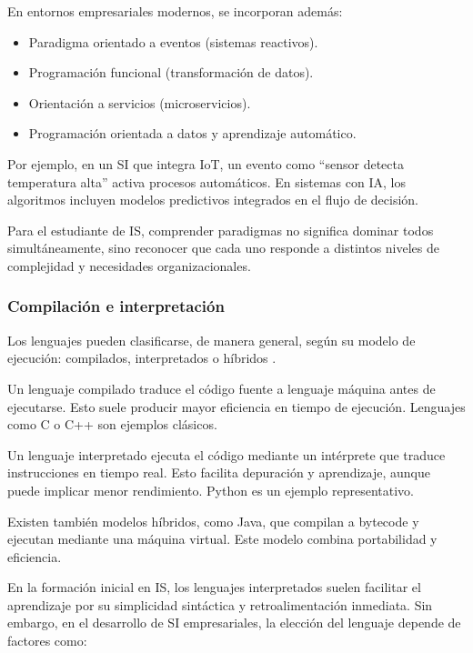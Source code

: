 \documentclass[12pt,twoside]{book}
\begin{document}
						En entornos empresariales modernos, se incorporan además:
						
						\begin{itemize}
							\item Paradigma orientado a eventos (sistemas reactivos).
							\item Programación funcional (transformación de datos).
							\item Orientación a servicios (microservicios).
							\item Programación orientada a datos y aprendizaje automático.
						\end{itemize}
						
						Por ejemplo, en un SI que integra IoT, un evento como “sensor detecta temperatura alta” activa procesos automáticos. En sistemas con IA, los algoritmos incluyen modelos predictivos integrados en el flujo de decisión.
						
						Para el estudiante de IS, comprender paradigmas no significa dominar todos simultáneamente, sino reconocer que cada uno responde a distintos niveles de complejidad y necesidades organizacionales.
					
					\subsubsection{Compilación e interpretación}
						\noindent
						Los lenguajes pueden clasificarse, de manera general, según su modelo de ejecución: compilados, interpretados o híbridos \cite{Sebesta2018Concepts,Tanenbaum2021Structured}.
						
						Un lenguaje compilado traduce el código fuente a lenguaje máquina antes de ejecutarse. Esto suele producir mayor eficiencia en tiempo de ejecución. Lenguajes como C o C++ son ejemplos clásicos.
						
						Un lenguaje interpretado ejecuta el código mediante un intérprete que traduce instrucciones en tiempo real. Esto facilita depuración y aprendizaje, aunque puede implicar menor rendimiento. Python es un ejemplo representativo.
						
						Existen también modelos híbridos, como Java, que compilan a bytecode y ejecutan mediante una máquina virtual. Este modelo combina portabilidad y eficiencia.
						
						En la formación inicial en IS, los lenguajes interpretados suelen facilitar el aprendizaje por su simplicidad sintáctica y retroalimentación inmediata. Sin embargo, en el desarrollo de SI empresariales, la elección del lenguaje depende de factores como:
						
\end{document}

